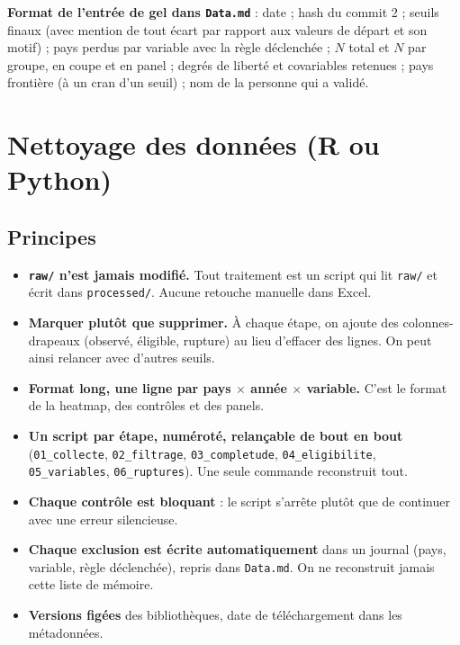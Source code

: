 \documentclass[21pt,a4paper]{article}
\begin{document}
	\textbf{Format de l'entrée de gel dans \texttt{Data.md}} : date ; hash du commit 2 ; seuils finaux (avec mention de tout écart par rapport aux valeurs de départ et son motif) ; pays perdus par variable avec la règle déclenchée ; $N$ total et $N$ par groupe, en coupe et en panel ; degrés de liberté et covariables retenues ; pays frontière (à un cran d'un seuil) ; nom de la personne qui a validé.
	
	\section{Nettoyage des données (R ou Python)}
	\label{sec:nettoyage}
	
	\subsection{Principes}
	
	\begin{itemize}
		\item \textbf{\texttt{raw/} n'est jamais modifié.} Tout traitement est un script qui lit \texttt{raw/} et écrit dans \texttt{processed/}. Aucune retouche manuelle dans Excel.
		\item \textbf{Marquer plutôt que supprimer.} À chaque étape, on ajoute des colonnes-drapeaux (observé, éligible, rupture) au lieu d'effacer des lignes. On peut ainsi relancer avec d'autres seuils.
		\item \textbf{Format long, une ligne par pays $\times$ année $\times$ variable.} C'est le format de la heatmap, des contrôles et des panels.
		\item \textbf{Un script par étape, numéroté, relançable de bout en bout} (\texttt{01\_collecte}, \texttt{02\_filtrage}, \texttt{03\_completude}, \texttt{04\_eligibilite}, \texttt{05\_variables}, \texttt{06\_ruptures}). Une seule commande reconstruit tout.
		\item \textbf{Chaque contrôle est bloquant} : le script s'arrête plutôt que de continuer avec une erreur silencieuse.
		\item \textbf{Chaque exclusion est écrite automatiquement} dans un journal (pays, variable, règle déclenchée), repris dans \texttt{Data.md}. On ne reconstruit jamais cette liste de mémoire.
		\item \textbf{Versions figées} des bibliothèques, date de téléchargement dans les métadonnées.
	\end{itemize}
	
\end{document}
